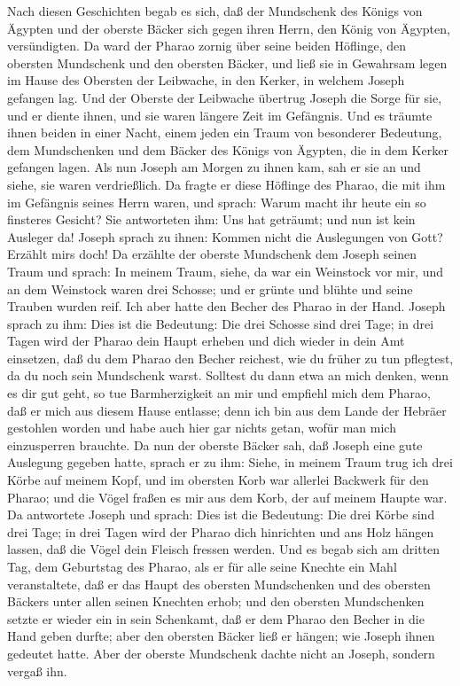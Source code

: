  Nach diesen Geschichten begab es sich, daß der Mundschenk
des Königs von Ägypten und der oberste Bäcker sich gegen ihren Herrn,
den König von Ägypten, versündigten.  Da ward der Pharao
zornig über seine beiden Höflinge, den obersten Mundschenk und den
obersten Bäcker,  und ließ sie in Gewahrsam legen im Hause
des Obersten der Leibwache, in den Kerker, in welchem Joseph gefangen
lag.  Und der Oberste der Leibwache übertrug Joseph die
Sorge für sie, und er diente ihnen, und sie waren längere Zeit im
Gefängnis.  Und es träumte ihnen beiden in einer Nacht,
einem jeden ein Traum von besonderer Bedeutung, dem Mundschenken und dem
Bäcker des Königs von Ägypten, die in dem Kerker gefangen lagen.
 Als nun Joseph am Morgen zu ihnen kam, sah er sie an und
siehe, sie waren verdrießlich.  Da fragte er diese
Höflinge des Pharao, die mit ihm im Gefängnis seines Herrn waren, und
sprach: Warum macht ihr heute ein so finsteres Gesicht? 
Sie antworteten ihm: Uns hat geträumt; und nun ist kein Ausleger da!
Joseph sprach zu ihnen: Kommen nicht die Auslegungen von Gott? Erzählt
mir\textquotesingle s doch!  Da erzählte der oberste
Mundschenk dem Joseph seinen Traum und sprach: In meinem Traum, siehe,
da war ein Weinstock vor mir,  und an dem Weinstock waren
drei Schosse; und er grünte und blühte und seine Trauben wurden reif.
 Ich aber hatte den Becher des Pharao in der Hand.
 Joseph sprach zu ihm: Dies ist die Bedeutung: Die drei
Schosse sind drei Tage;  in drei Tagen wird der Pharao
dein Haupt erheben und dich wieder in dein Amt einsetzen, daß du dem
Pharao den Becher reichest, wie du früher zu tun pflegtest, da du noch
sein Mundschenk warst.  Solltest du dann etwa an mich
denken, wenn es dir gut geht, so tue Barmherzigkeit an mir und empfiehl
mich dem Pharao, daß er mich aus diesem Hause entlasse; 
denn ich bin aus dem Lande der Hebräer gestohlen worden und habe auch
hier gar nichts getan, wofür man mich einzusperren brauchte.
 Da nun der oberste Bäcker sah, daß Joseph eine gute
Auslegung gegeben hatte, sprach er zu ihm: Siehe, in meinem Traum trug
ich drei Körbe auf meinem Kopf,  und im obersten Korb war
allerlei Backwerk für den Pharao; und die Vögel fraßen es mir aus dem
Korb, der auf meinem Haupte war.  Da antwortete Joseph
und sprach: Dies ist die Bedeutung: Die drei Körbe sind drei Tage;
 in drei Tagen wird der Pharao dich hinrichten und ans
Holz hängen lassen, daß die Vögel dein Fleisch fressen werden.
 Und es begab sich am dritten Tag, dem Geburtstag des
Pharao, als er für alle seine Knechte ein Mahl veranstaltete, daß er das
Haupt des obersten Mundschenken und des obersten Bäckers unter allen
seinen Knechten erhob;  und den obersten Mundschenken
setzte er wieder ein in sein Schenkamt, daß er dem Pharao den Becher in
die Hand geben durfte;  aber den obersten Bäcker ließ er
hängen; wie Joseph ihnen gedeutet hatte.  Aber der
oberste Mundschenk dachte nicht an Joseph, sondern vergaß ihn.

